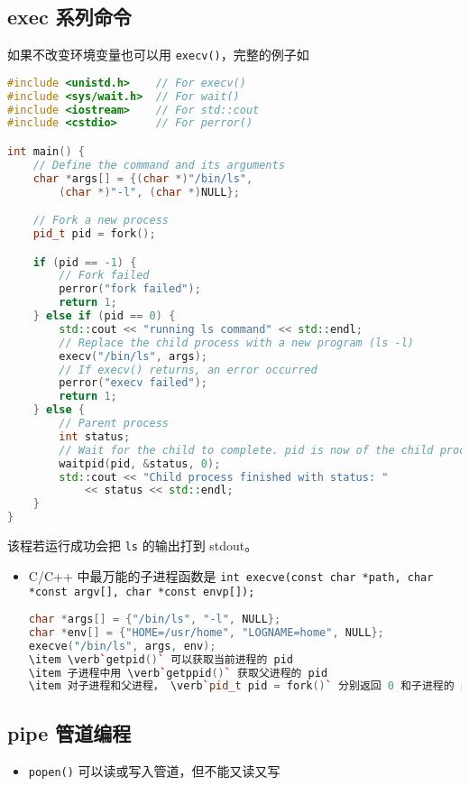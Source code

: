 
\subsection{exec 系列命令}
如果不改变环境变量也可以用 \verb`execv()`，完整的例子如
\begin{lstlisting}[language=cpp]
#include <unistd.h>    // For execv()
#include <sys/wait.h>  // For wait()
#include <iostream>    // For std::cout
#include <cstdio>      // For perror()

int main() {
    // Define the command and its arguments
    char *args[] = {(char *)"/bin/ls",
        (char *)"-l", (char *)NULL};

    // Fork a new process
    pid_t pid = fork();

    if (pid == -1) {
        // Fork failed
        perror("fork failed");
        return 1;
    } else if (pid == 0) {
        std::cout << "running ls command" << std::endl;
        // Replace the child process with a new program (ls -l)
        execv("/bin/ls", args);
        // If execv() returns, an error occurred
        perror("execv failed");
        return 1;
    } else {
        // Parent process
        int status;
        // Wait for the child to complete. pid is now of the child process
        waitpid(pid, &status, 0);
        std::cout << "Child process finished with status: "
            << status << std::endl;
    }
}
\end{lstlisting}
该程若运行成功会把 \verb`ls` 的输出打到 stdout。

\begin{itemize}
\item C/C++ 中最万能的子进程函数是 \verb`int execve(const char *path, char *const argv[], char *const envp[]);`
\begin{lstlisting}[language=cpp]
char *args[] = {"/bin/ls", "-l", NULL};
char *env[] = {"HOME=/usr/home", "LOGNAME=home", NULL};
execve("/bin/ls", args, env);
\item \verb`getpid()` 可以获取当前进程的 pid
\item 子进程中用 \verb`getppid()` 获取父进程的 pid
\item 对子进程和父进程， \verb`pid_t pid = fork()` 分别返回 0 和子进程的 pid。
\end{lstlisting}
\end{itemize}

\subsection{pipe 管道编程}
\begin{itemize}
\item \verb`popen()` 可以读或写入管道，但不能又读又写
\end{itemize}

